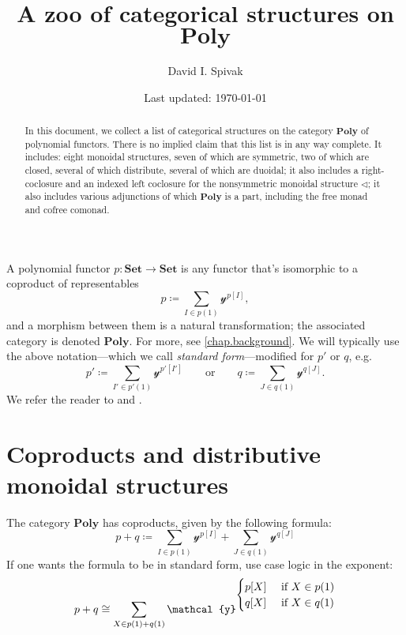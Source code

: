 \documentclass[11pt, one side, article]{memoir}
\theoremstyle{definition}
\theoremstyle{plain}
\newcommand{\Cat}[1]{\mathbf{#1}}%
\newcommand{\tn}[1]{\textnormal{#1}}
\newcommand{\smset}{\Cat{Set}}
\newcommand{\yon}{\mathcal{y}}
\newcommand{\poly}{\Cat{Poly}}
\newcommand{\0}{\textsf{0}}
\newcommand{\1}{\tn{\textsf{1}}}
\newcommand{\tri}{\mathbin{\triangleleft}}
\newcommand{\qqor}{\qquad\text{or}\qquad}
\begin{document}
\title{A zoo of categorical structures on $\poly$}

\author{David I. Spivak}

\date{Last updated: \today}

\maketitle

\begin{abstract}
In this document, we collect a list of categorical structures on the category $\poly$ of polynomial functors. There is no implied claim that this list is in any way complete. It includes: eight monoidal structures, seven of which are symmetric, two of which are closed, several of which distribute, several of which are duoidal; it also includes a right-coclosure and an indexed left coclosure for the nonsymmetric monoidal structure $\tri$; it also includes various adjunctions of which $\poly$ is a part, including the free monad and cofree comonad. 
\end{abstract}

A polynomial functor $p\colon\smset\to\smset$ is any functor that's isomorphic to a coproduct of representables
\[
p\coloneqq\sum_{I\in p(1)}\yon^{p[I]},
\]
and a morphism between them is a natural transformation; the associated category is denoted $\poly$. For more, see \cref{chap.background}. We will typically use the above notation---which we call \emph{standard form}---modified for $p'$ or $q$, e.g.
\[
p'\coloneqq\sum_{I'\in p'(1)}\yon^{p'[I']}
\qqor
q\coloneqq\sum_{J\in q(1)}\yon^{q[J]}.
\]
We refer the reader to \cite{spivak2022poly} and \cite{spivak2021functorial}.

\chapter{Coproducts and distributive monoidal structures}

The category $\poly$ has coproducts, given by the following formula:
\begin{equation}
p+q\coloneqq\sum_{I\in p(1)}\yon^{p[I]}+\sum_{J\in q(1)}\yon^{q[J]}
\end{equation}
If one wants the formula to be in standard form, use case logic in the exponent:
\begin{equation}
p+q\cong\sum_{X\in p(1)+q(1)}\yon^{
	\begin{cases}
  	p[X]&\tn{ if }X\in p(1)\\
  	q[X]&\tn{ if }X\in q(1)
	\end{cases}
	}
\end{equation}
\end{document}
